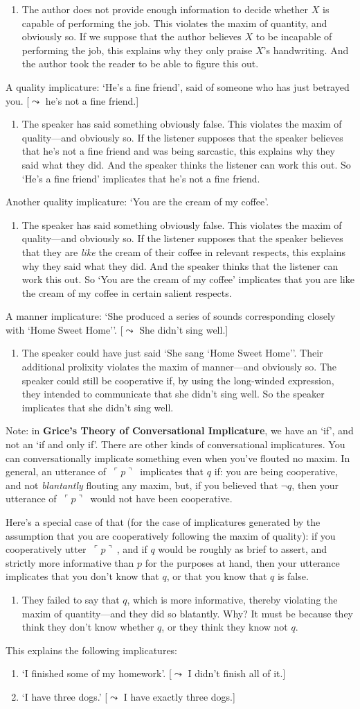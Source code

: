 \documentclass[landscape, two column, full page,reqno]{article}
\newcommand{\qe}{\begin{enumerate}[align=left,style=nextline,leftmargin=17pt,labelsep=5pt,font=\normalfont]}
\newcommand{\ze}{\end{enumerate}}
\newcommand{\p}{\item}
\newcommand{\e}{\emph}
\newcommand{\tbf}{\textbf}
\newcommand{\qq}[1]{~\ulcorner #1  \urcorner~}
\begin{document}
	\qe
	\p The author does not provide enough information to decide whether $X$ is capable of performing the job.  This violates the maxim of quantity, and obviously so.  If we suppose that the author believes $X$ to be incapable of performing the job, this explains why they only praise $X$'s handwriting.  And the author took the reader to be able to figure this out.    
	\ze 
\p A quality implicature: `He's a fine friend', said of someone who has just betrayed you. [$\leadsto$ he's not a fine friend.]
	\qe
	\p The speaker has said something obviously false.  This violates the maxim of quality---and obviously so.  If the listener supposes that the speaker believes that he's not a fine friend and was being sarcastic, this explains why they said what they did.  And the speaker thinks the listener can work this out.  So `He's a fine friend' implicates that he's not a fine friend.
	\ze 
\p Another quality implicature: `You are the cream of my coffee'.
	\qe
	\p The speaker has said something obviously false.  This violates the maxim of quality---and obviously so.  If the listener supposes that the speaker believes that they are \e{like} the cream of their coffee in relevant respects, this explains why they said what they did.  And the speaker thinks that the listener can work this out.  So `You are the cream of my coffee' implicates that you are like the cream of my coffee in certain salient respects.
	\ze 
\p A manner implicature: `She produced a series of sounds corresponding closely with `Home Sweet Home''. [$\leadsto$ She didn't sing well.]
	\qe
	\p The speaker could have just said `She sang `Home Sweet Home''.  Their additional prolixity violates the maxim of manner---and obviously so.   The speaker could still be cooperative if, by using the long-winded expression, they intended to communicate that she didn't sing well.  So the speaker implicates that she didn't sing well.
	\ze 
\p Note: in \tbf{Grice's Theory of Conversational Implicature}, we have an `if', and not an `if and only if'.  There are other kinds of conversational implicatures.   You can conversationally implicate something even when you've flouted no maxim.  In general, an utterance of $\qq{p}$ implicates that $q$ if: you are being cooperative, and not \e{blantantly} flouting any maxim, but, if you believed that $\neg q$, then your utterance of $\qq{p}$ would not have been cooperative.

\p  Here's a special case of that (for the case of implicatures generated by the assumption that  you are cooperatively following the maxim of quality): if you cooperatively utter $\qq{p}$, and if $q$ would be roughly as brief to assert, and strictly more informative than $p$ for the purposes at hand, then your utterance implicates that you don't know that $q$, or that you know that $q$ is false.
	\qe
	\p They failed to say that $q$, which is more informative, thereby violating the maxim of quantity---and they did so blatantly.  Why?  It must be because they think they don't know whether $q$, or they think they know not $q$.
	\ze  
\p This explains the following implicatures:
	\qe
	\p `I finished some of my homework'. [$\leadsto$ I didn't finish all of it.]
	\p `I have three dogs.' [$\leadsto$ I have exactly three dogs.]
	\ze 
\end{document}
